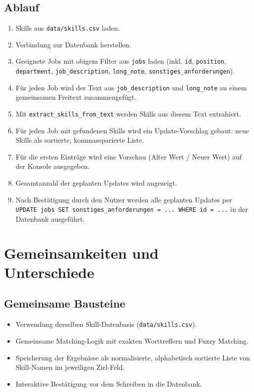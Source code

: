 \documentclass[12pt,a4paper]{article}
\begin{document}
\subsection{Ablauf}
\begin{enumerate}
    \item Skills aus \texttt{data/skills.csv} laden.
    \item Verbindung zur Datenbank herstellen.
    \item Geeignete Jobs mit obigem Filter aus \texttt{jobs} laden
          (inkl. \texttt{id}, \texttt{position}, \texttt{department},
           \texttt{job\_description}, \texttt{long\_note}, \texttt{sonstiges\_anforderungen}).
    \item Für jeden Job wird der Text aus \texttt{job\_description} und
          \texttt{long\_note} zu einem gemeinsamen Freitext zusammengefügt.
    \item Mit \texttt{extract\_skills\_from\_text} werden Skills aus diesem Text extrahiert.
    \item Für jeden Job mit gefundenen Skills wird ein Update-Vorschlag gebaut:
          neue Skills als sortierte, kommaseparierte Liste.
    \item Für die ersten Einträge wird eine Vorschau (Alter Wert / Neuer Wert)
          auf der Konsole ausgegeben.
    \item Gesamtanzahl der geplanten Updates wird angezeigt.
    \item Nach Bestätigung durch den Nutzer werden alle geplanten Updates per
          \texttt{UPDATE jobs SET sonstiges\_anforderungen = ... WHERE id = ...}
          in der Datenbank ausgeführt.
\end{enumerate}

\section{Gemeinsamkeiten und Unterschiede}

\subsection{Gemeinsame Bausteine}

\begin{itemize}
    \item Verwendung derselben Skill-Datenbasis (\texttt{data/skills.csv}).
    \item Gemeinsame Matching-Logik mit exakten Worttreffern und Fuzzy Matching.
    \item Speicherung der Ergebnisse als normalisierte, alphabetisch sortierte
          Liste von Skill-Namen im jeweiligen Ziel-Feld.
    \item Interaktive Bestätigung vor dem Schreiben in die Datenbank.
\end{itemize}
\end{document}
